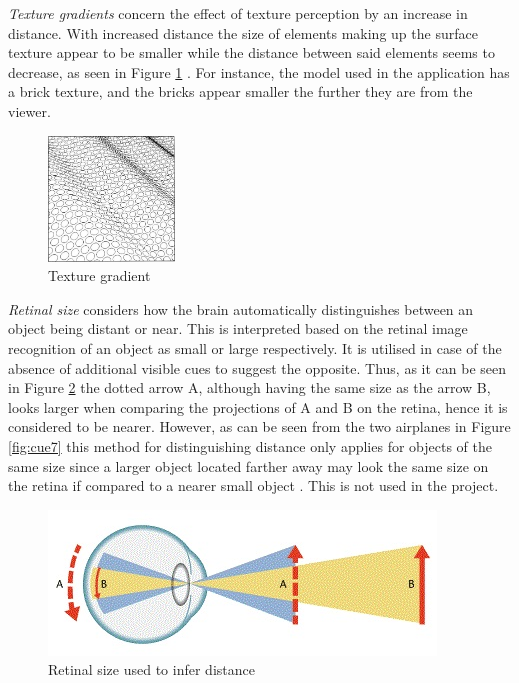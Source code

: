 \textit{Texture gradients} concern the effect of texture perception by an increase in distance. With increased distance the size of elements making up the surface texture appear to be smaller while the distance between said elements seems to decrease, as seen in Figure \ref{fig:cue5} \cite{Gale}. For instance, the model used in the application has a brick texture, and the bricks appear smaller the further they are from the viewer.

\begin{figure}[h!]
   \centering
   \includegraphics[width=0.3\textwidth]{figures/cue5.jpg}
   \caption{Texture gradient \cite{Heeger}}\label{fig:cue5}
\end{figure}

\textit{Retinal size} considers how the brain automatically distinguishes between an object being distant or near. This is interpreted based on the retinal image recognition of an object as small or large respectively. It is utilised in case of the absence of additional visible cues to suggest the opposite. Thus, as it can be seen in Figure \ref{fig:cue6} the dotted arrow A, although having the same size as the arrow B, looks larger when comparing the projections of A and B on the retina,  hence it is considered to be nearer. However, as can be seen from the two airplanes in Figure \ref{fig:cue7} this method for distinguishing distance only applies for objects of the same size since a larger object located farther away may look the same size on the retina if compared to a nearer small object \cite{Gale}. This is not used in the project.

\begin{figure}[h!]
   \centering
   \includegraphics[scale=0.6]{figures/cue6.jpg}
   \caption{Retinal size used to infer distance \cite{Perslides}}\label{fig:cue6}
\end{figure}

